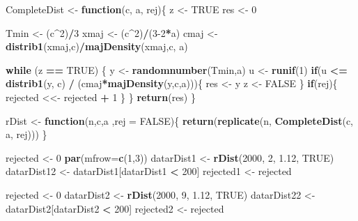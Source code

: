 \documentclass[
]{article}
\newenvironment{Shaded}{\begin{snugshade}}{\end{snugshade}}
\newcommand{\ControlFlowTok}[1]{\textcolor[rgb]{0.13,0.29,0.53}{\textbf{#1}}}
\newcommand{\DataTypeTok}[1]{\textcolor[rgb]{0.13,0.29,0.53}{#1}}
\newcommand{\DecValTok}[1]{\textcolor[rgb]{0.00,0.00,0.81}{#1}}
\newcommand{\FloatTok}[1]{\textcolor[rgb]{0.00,0.00,0.81}{#1}}
\newcommand{\KeywordTok}[1]{\textcolor[rgb]{0.13,0.29,0.53}{\textbf{#1}}}
\newcommand{\NormalTok}[1]{#1}
\newcommand{\OperatorTok}[1]{\textcolor[rgb]{0.81,0.36,0.00}{\textbf{#1}}}
\newcommand{\OtherTok}[1]{\textcolor[rgb]{0.56,0.35,0.01}{#1}}
\newcommand{\StringTok}[1]{\textcolor[rgb]{0.31,0.60,0.02}{#1}}
\begin{document}
\begin{Shaded}
\begin{Highlighting}[]
\NormalTok{CompleteDist <-}\StringTok{ }\ControlFlowTok{function}\NormalTok{(c, a, rej)\{}
\NormalTok{  z <-}\StringTok{ }\OtherTok{TRUE}
\NormalTok{  res <-}\StringTok{ }\DecValTok{0}

\NormalTok{  Tmin <-}\StringTok{ }\NormalTok{(c}\OperatorTok{^}\DecValTok{2}\NormalTok{)}\OperatorTok{/}\DecValTok{3}
\NormalTok{  xmaj <-}\StringTok{ }\NormalTok{(c}\OperatorTok{^}\DecValTok{2}\NormalTok{)}\OperatorTok{/}\NormalTok{(}\DecValTok{3-2}\OperatorTok{*}\NormalTok{a)}
\NormalTok{  cmaj <-}\StringTok{ }\KeywordTok{distrib1}\NormalTok{(xmaj,c)}\OperatorTok{/}\KeywordTok{majDensity}\NormalTok{(xmaj,c, a) }
  
  \ControlFlowTok{while}\NormalTok{ (z }\OperatorTok{==}\StringTok{ }\OtherTok{TRUE}\NormalTok{) \{}
\NormalTok{    y <-}\StringTok{ }\KeywordTok{randomnumber}\NormalTok{(Tmin,a)}
\NormalTok{    u <-}\StringTok{ }\KeywordTok{runif}\NormalTok{(}\DecValTok{1}\NormalTok{)}
    \ControlFlowTok{if}\NormalTok{(u }\OperatorTok{<=}\StringTok{ }\KeywordTok{distrib1}\NormalTok{(y, c) }\OperatorTok{/}\StringTok{ }\NormalTok{(cmaj}\OperatorTok{*}\KeywordTok{majDensity}\NormalTok{(y,c,a)))\{}
\NormalTok{      res <-}\StringTok{ }\NormalTok{y}
\NormalTok{      z <-}\StringTok{ }\OtherTok{FALSE}    
\NormalTok{    \}}
    \ControlFlowTok{if}\NormalTok{(rej)\{}
\NormalTok{    rejected <<-}\StringTok{ }\NormalTok{rejected }\OperatorTok{+}\StringTok{ }\DecValTok{1}
\NormalTok{    \}}
\NormalTok{  \}}
  \KeywordTok{return}\NormalTok{(res)}
\NormalTok{\}}

\NormalTok{rDist <-}\StringTok{ }\ControlFlowTok{function}\NormalTok{(n,c,a ,}\DataTypeTok{rej =} \OtherTok{FALSE}\NormalTok{)\{}
 \KeywordTok{return}\NormalTok{(}\KeywordTok{replicate}\NormalTok{(n, }\KeywordTok{CompleteDist}\NormalTok{(c, a, rej)))}
\NormalTok{\}}




\NormalTok{rejected <-}\StringTok{ }\DecValTok{0}
\KeywordTok{par}\NormalTok{(}\DataTypeTok{mfrow=}\KeywordTok{c}\NormalTok{(}\DecValTok{1}\NormalTok{,}\DecValTok{3}\NormalTok{))}
\NormalTok{datarDist1 <-}\StringTok{ }\KeywordTok{rDist}\NormalTok{(}\DecValTok{2000}\NormalTok{, }\DecValTok{2}\NormalTok{, }\FloatTok{1.12}\NormalTok{, }\OtherTok{TRUE}\NormalTok{)}
\NormalTok{datarDist12 <-}\StringTok{ }\NormalTok{datarDist1[datarDist1 }\OperatorTok{<}\StringTok{ }\DecValTok{200}\NormalTok{]}
\NormalTok{rejected1 <-}\StringTok{ }\NormalTok{rejected}

\NormalTok{rejected <-}\StringTok{ }\DecValTok{0}
\NormalTok{datarDist2 <-}\StringTok{ }\KeywordTok{rDist}\NormalTok{(}\DecValTok{2000}\NormalTok{, }\DecValTok{9}\NormalTok{, }\FloatTok{1.12}\NormalTok{, }\OtherTok{TRUE}\NormalTok{)}
\NormalTok{datarDist22 <-}\StringTok{ }\NormalTok{datarDist2[datarDist2 }\OperatorTok{<}\StringTok{ }\DecValTok{200}\NormalTok{]}
\NormalTok{rejected2 <-}\StringTok{ }\NormalTok{rejected}


\end{Highlighting}
\end{Shaded}
\end{document}
